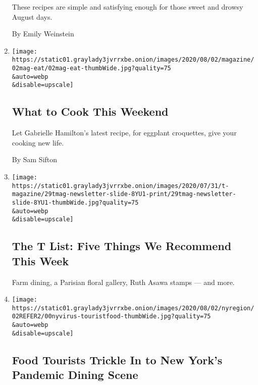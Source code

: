 \begin{enumerate}
  These recipes are simple and satisfying enough for those sweet and
  drowsy August days.

  By Emily Weinstein
\item
  \href{/2020/07/31/dining/what-to-cook-this-weekend.html}{}

  \texttt{[image: https://static01.graylady3jvrrxbe.onion/images/2020/08/02/magazine/02mag-eat/02mag-eat-thumbWide.jpg?quality=75\\\&auto=webp\\\&disable=upscale]}

  \hypertarget{what-to-cook-this-weekend}{%
  \subsection{What to Cook This
  Weekend}\label{what-to-cook-this-weekend}}

  Let Gabrielle Hamilton's latest recipe, for eggplant croquettes, give
  your cooking new life.

  By Sam Sifton
\item
  \href{/2020/07/30/t-magazine/the-t-list-five-things-we-recommend-this-week.html}{}

  \texttt{[image: https://static01.graylady3jvrrxbe.onion/images/2020/07/31/t-magazine/29tmag-newsletter-slide-8YU1-print/29tmag-newsletter-slide-8YU1-thumbWide.jpg?quality=75\\\&auto=webp\\\&disable=upscale]}

  \hypertarget{the-t-list-five-things-we-recommend-this-week}{%
  \subsection{The T List: Five Things We Recommend This
  Week}\label{the-t-list-five-things-we-recommend-this-week}}

  Farm dining, a Parisian floral gallery, Ruth Asawa stamps --- and
  more.
\item
  \href{/2020/07/30/nyregion/coronavirus-nyc-tourism-restaurants.html}{}

  \texttt{[image: https://static01.graylady3jvrrxbe.onion/images/2020/08/02/nyregion/02REFER2/00nyvirus-touristfood-thumbWide.jpg?quality=75\\\&auto=webp\\\&disable=upscale]}

  \hypertarget{food-tourists-trickle-in-to-new-yorks-pandemic-dining-scene}{%
  \subsection{Food Tourists Trickle In to New York's Pandemic Dining
  Scene}\label{food-tourists-trickle-in-to-new-yorks-pandemic-dining-scene}}


\end{enumerate}
